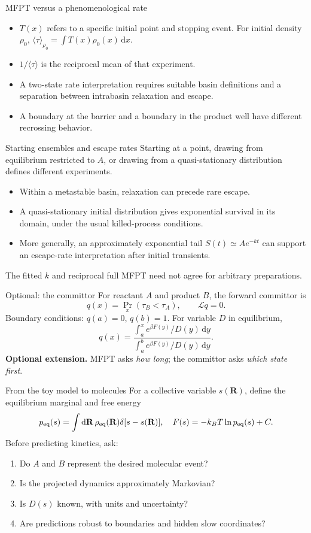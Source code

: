 \documentclass[aspectratio=169,10pt]{beamer}
\newcommand{\dd}{\mathrm{d}}
\begin{document}
\begin{frame}{MFPT versus a phenomenological rate}
\begin{itemize}
\item $T(x)$ refers to a specific initial point and stopping event. For initial density $\rho_0$, $\langle\tau\rangle_{\rho_0}=\int T(x)\rho_0(x)\,\dd x$.
\item $1/\langle\tau\rangle$ is the reciprocal mean of that experiment.
\item A two-state rate interpretation requires suitable basin definitions and a separation between intrabasin relaxation and escape.
\item A boundary at the barrier and a boundary in the product well have different recrossing behavior.
\end{itemize}
\end{frame}

\begin{frame}{Starting ensembles and escape rates}
Starting at a point, drawing from equilibrium restricted to $A$, or drawing from a quasi-stationary distribution defines different experiments.
\begin{itemize}
\item Within a metastable basin, relaxation can precede rare escape.
\item A quasi-stationary initial distribution gives exponential survival in its domain, under the usual killed-process conditions.
\item More generally, an approximately exponential tail $S(t)\simeq A e^{-kt}$ can support an escape-rate interpretation after initial transients.
\end{itemize}
\small The fitted $k$ and reciprocal full MFPT need not agree for arbitrary preparations.
\end{frame}

\begin{frame}{Optional: the committor}
For reactant $A$ and product $B$, the forward committor is
\[q(x)=\Pr_x(\tau_B<\tau_A),\qquad \mathcal Lq=0.\]
Boundary conditions: $q(a)=0$, $q(b)=1$. For variable $D$ in equilibrium,
\[q(x)=\frac{\int_a^x e^{\beta F(y)}/D(y)\,\dd y}{\int_a^b e^{\beta F(y)}/D(y)\,\dd y}.\]
\textbf{Optional extension.} MFPT asks \emph{how long}; the committor asks \emph{which state first}.
\end{frame}

\begin{frame}{From the toy model to molecules}
For a collective variable $s(\mathbf R)$, define the equilibrium marginal and free energy
\[p_{\rm eq}(s)=\int \dd\mathbf R\,\rho_{\rm eq}(\mathbf R)\delta[s-s(\mathbf R)],\quad F(s)=-k_BT\ln p_{\rm eq}(s)+C.\]
Before predicting kinetics, ask:
\begin{enumerate}\item Do $A$ and $B$ represent the desired molecular event?\item Is the projected dynamics approximately Markovian?\item Is $D(s)$ known, with units and uncertainty?\item Are predictions robust to boundaries and hidden slow coordinates?\end{enumerate}
\end{frame}
\end{document}
